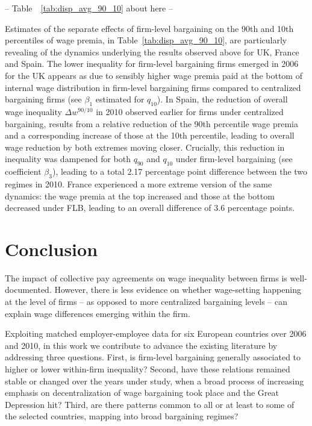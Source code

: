 \documentclass[12pt]{article}
\begin{document}
\begin{center}
-- Table~~\ref{tab:disp_avg_90_10} about here --
\end{center}


Estimates of the separate effects of firm-level bargaining on the 90th and 10th percentiles of wage premia, in Table~\ref{tab:disp_avg_90_10}, are particularly revealing of the dynamics underlying the results observed above for UK, France and Spain. The lower inequality for firm-level bargaining firms emerged in 2006 for the UK appears as due to sensibly higher wage premia paid at the bottom of internal wage distribution in firm-level bargaining firms compared to centralized bargaining firms (see $\beta_1$ estimated for $q_{10}$). In Spain, the reduction of overall wage inequality $\Delta w^{90/10}$ in 2010 observed earlier for firms under centralized bargaining, results from a relative reduction of the 90th percentile wage premia and a corresponding increase of those at the 10th percentile, leading to overall wage reduction by both extremes moving closer.
Crucially, this reduction in inequality was dampened for both $q_{90}$ and $q_{10}$ under firm-level bargaining (see coefficient $\beta_3$), leading to a total 2.17 percentage point difference between the two regimes in 2010. France experienced a more extreme version of the same dynamics: the wage premia at the top increased and those at the bottom decreased under FLB, leading to an overall difference of 3.6 percentage points.

\section*{Conclusion}
\label{sec:conclusion}
The impact of collective pay agreements on wage inequality between firms is well-documented. However, there is less evidence on whether wage-setting happening at the level of firms -- as opposed to more centralized bargaining levels -- can explain wage differences emerging within the firm. 

Exploiting matched employer-employee data for six European countries over 2006 and 2010, in this work we contribute to advance the existing literature by addressing three questions. First, is firm-level bargaining generally associated to higher or lower within-firm inequality? Second, have these relations remained stable or changed over the years under study, when a broad process of increasing emphasis on decentralization of wage bargaining took place and the Great Depression hit? Third, are there patterns common to all or at least to some of the selected countries, mapping into broad bargaining regimes?
\end{document}
